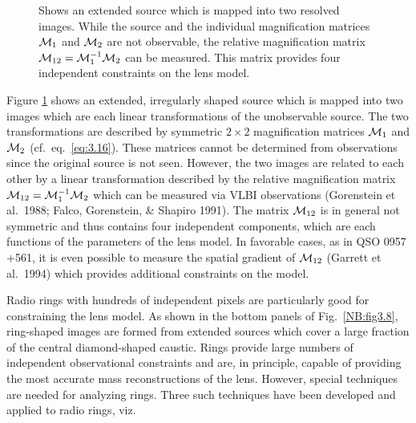 \documentclass[a4paper,10pt]{article} %
\begin{document}
\begin{figure}[ht] %
\begin{center}
\begin{minipage}[t]{0.6\hsize}
\end{minipage}
\end{center}
\caption{Shows an extended source which is mapped into two resolved
  images. While the source and the individual magnification matrices
  ${\cal M}_1$ and ${\cal M}_2$ are not observable, the relative
  magnification matrix ${\cal M}_{12}={\cal M}_1^{-1}{\cal M}_2$ can
  be measured. This matrix provides four independent constraints on
  the lens model.}
\label{NB:fig3.10}
\end{figure}

Figure \ref{NB:fig3.10} shows an extended, irregularly shaped source
which is mapped into two images which are each linear transformations
of the unobservable source. The two transformations are described by
symmetric $2\times2$ magnification matrices ${\cal M}_1$ and ${\cal
M}_2$ (cf.\ eq.\ \ref{eq:3.16}). These matrices cannot be determined
from observations since the original source is not seen. However, the
two images are related to each other by a linear transformation
described by the relative magnification matrix ${\cal M}_{12}={\cal
M}_1^{-1}{\cal M}_2$ which can be measured via VLBI observations
(Gorenstein et al.\ 1988; Falco, Gorenstein, \& Shapiro 1991). The
matrix ${\cal M}_{12}$ is in general not symmetric and thus contains
four independent components, which are each functions of the
parameters of the lens model. In favorable cases, as in QSO
0957$+$561, it is even possible to measure the spatial gradient of
${\cal M}_{12}$ (Garrett et al.\ 1994) which provides additional
constraints on the model.

Radio rings with hundreds of independent pixels are particularly good
for constraining the lens model. As shown in the bottom panels of
Fig.\ \ref{NB:fig3.8}, ring-shaped images are formed from extended
sources which cover a large fraction of the central diamond-shaped
caustic. Rings provide large numbers of independent observational
constraints and are, in principle, capable of providing the most
accurate mass reconstructions of the lens. However, special techniques
are needed for analyzing rings. Three such techniques have been
developed and applied to radio rings, viz.
\end{document}
